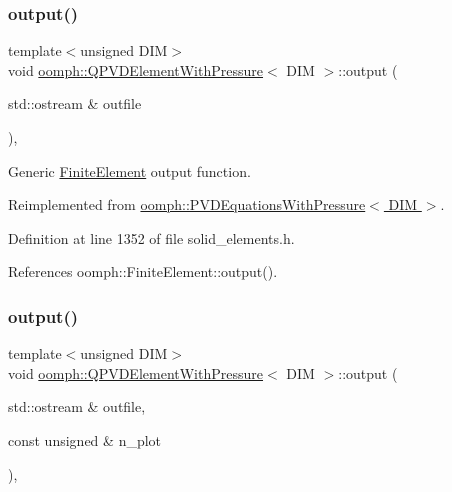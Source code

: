 \subsubsection{\texorpdfstring{output()}{output()}\hspace{0.1cm}{\footnotesize\ttfamily [1/4]}}
{\footnotesize\ttfamily template$<$unsigned D\+IM$>$ \\
void \hyperlink{classoomph_1_1QPVDElementWithPressure}{oomph\+::\+Q\+P\+V\+D\+Element\+With\+Pressure}$<$ D\+IM $>$\+::output (\begin{DoxyParamCaption}\item[{std\+::ostream \&}]{outfile }\end{DoxyParamCaption})\hspace{0.3cm}{\ttfamily [inline]}, {\ttfamily [virtual]}}



Generic \hyperlink{classoomph_1_1FiniteElement}{Finite\+Element} output function. 



Reimplemented from \hyperlink{classoomph_1_1PVDEquationsWithPressure_a1853eace3f079f90cc34df8029bd3dba}{oomph\+::\+P\+V\+D\+Equations\+With\+Pressure$<$ D\+I\+M $>$}.



Definition at line 1352 of file solid\+\_\+elements.\+h.



References oomph\+::\+Finite\+Element\+::output().

\mbox{\label{classoomph_1_1QPVDElementWithPressure_ad47eebe6e14138c64fc313f3ecda8d6e}} 
\subsubsection{\texorpdfstring{output()}{output()}\hspace{0.1cm}{\footnotesize\ttfamily [2/4]}}
{\footnotesize\ttfamily template$<$unsigned D\+IM$>$ \\
void \hyperlink{classoomph_1_1QPVDElementWithPressure}{oomph\+::\+Q\+P\+V\+D\+Element\+With\+Pressure}$<$ D\+IM $>$\+::output (\begin{DoxyParamCaption}\item[{std\+::ostream \&}]{outfile,  }\item[{const unsigned \&}]{n\+\_\+plot }\end{DoxyParamCaption})\hspace{0.3cm}{\ttfamily [inline]}, {\ttfamily [virtual]}}



